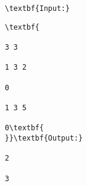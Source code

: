 \begin{verbatim}
\textbf{Input:}\end{verbatim}
\begin{verbatim}
\textbf{

3 3

1 3 2

0

1 3 5

0\textbf{
}}\textbf{Output:}

2

3\end{verbatim}